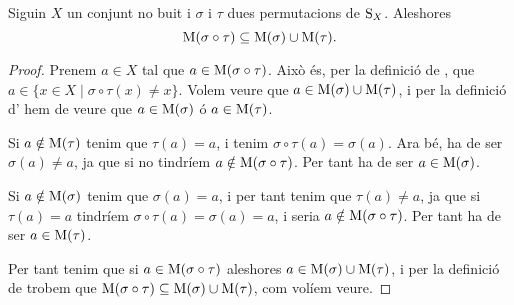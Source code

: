 \documentclass[../../Main.tex]{subfiles}
\begin{document}
	\begin{proposition}
		\label{prop:Mou de la conjugació és unió dels Mous}
		Siguin \(X\) un conjunt no buit i \(\sigma\) i \(\tau\) dues permutacions de \(\operatorname{S}_{X}\). Aleshores
		\[\operatorname{M}(\sigma\circ\tau)\subseteq\operatorname{M}(\sigma)\cup\operatorname{M}(\tau).\]
		\begin{proof}
			Prenem \(a\in X\) tal que \(a\in\operatorname{M}(\sigma\circ\tau)\). Això és, per la definició de , que \(a\in\{x\in X\mid\sigma\circ\tau(x)\neq x\}\). Volem veure que \(a\in\operatorname{M}(\sigma)\cup\operatorname{M}(\tau)\), i per la definició d' hem de veure que \(a\in\operatorname{M}(\sigma)\) ó \(a\in\operatorname{M}(\tau)\).
			
			Si \(a\notin\operatorname{M}(\tau)\) tenim que \(\tau(a)=a\), i tenim \(\sigma\circ\tau(a)=\sigma(a)\). Ara bé, ha de ser \(\sigma(a)\neq a\), ja que si no tindríem \(a\notin\operatorname{M}(\sigma\circ\tau)\). Per tant ha de ser \(a\in\operatorname{M}(\sigma)\).
			
			Si \(a\notin\operatorname{M}(\sigma)\) tenim que \(\sigma(a)=a\), i per tant tenim que \(\tau(a)\neq a\), ja que si \(\tau(a)=a\) tindríem \(\sigma\circ\tau(a)=\sigma(a)=a\), i seria \(a\notin\operatorname{M}(\sigma\circ\tau)\). Per tant ha de ser \(a\in\operatorname{M}(\tau)\).
			
			Per tant tenim que si \(a\in\operatorname{M}(\sigma\circ\tau)\) aleshores \(a\in\operatorname{M}(\sigma)\cup\operatorname{M}(\tau)\), i per la definició de  trobem que \(\operatorname{M}(\sigma\circ\tau)\subseteq\operatorname{M}(\sigma)\cup\operatorname{M}(\tau)\), com volíem veure.
		\end{proof}
	\end{proposition}
\end{document}
